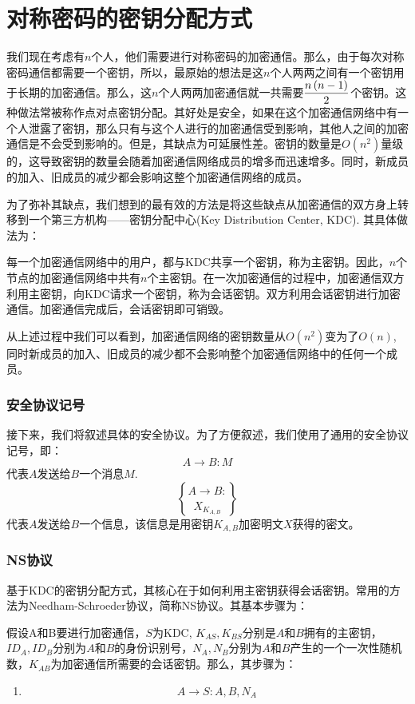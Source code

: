 \section{对称密码的密钥分配方式}
我们现在考虑有$n$个人，他们需要进行对称密码的加密通信。那么，由于每次对称密码通信都需要一个密钥，所以，最原始的想法是这$n$个人两两之间有一个密钥用于长期的加密通信。那么，这$n$个人两两加密通信就一共需要$\displaystyle\frac{n\left( {n-1}\right)}{2}$个密钥。这种做法常被称作点对点密钥分配。其好处是安全，如果在这个加密通信网络中有一个人泄露了密钥，那么只有与这个人进行的加密通信受到影响，其他人之间的加密通信是不会受到影响的。但是，其缺点为可延展性差。密钥的数量是$O(n^2)$量级的，这导致密钥的数量会随着加密通信网络成员的增多而迅速增多。同时，新成员的加入、旧成员的减少都会影响这整个加密通信网络的成员。\par
为了弥补其缺点，我们想到的最有效的方法是将这些缺点从加密通信的双方身上转移到一个第三方机构——密钥分配中心(Key Distribution Center, KDC). 其具体做法为：\par
每一个加密通信网络中的用户，都与KDC共享一个密钥，称为主密钥。因此，$n$个节点的加密通信网络中共有$n$个主密钥。在一次加密通信的过程中，加密通信双方利用主密钥，向KDC请求一个密钥，称为会话密钥。双方利用会话密钥进行加密通信。加密通信完成后，会话密钥即可销毁。\par
从上述过程中我们可以看到，加密通信网络的密钥数量从$O(n^2)$变为了$O(n)$, 同时新成员的加入、旧成员的减少都不会影响整个加密通信网络中的任何一个成员。
\subsubsection{安全协议记号}
接下来，我们将叙述具体的安全协议。为了方便叙述，我们使用了通用的安全协议记号，即：
\[A\to B: M\]
代表$A$发送给$B$一个消息$M$.
\[A\to B: \brace{X}_{K_{A, B}}\]
代表$A$发送给$B$一个信息，该信息是用密钥$K_{A, B}$加密明文$X$获得的密文。
\subsubsection{NS协议}
基于KDC的密钥分配方式，其核心在于如何利用主密钥获得会话密钥。常用的方法为Needham-Schroeder协议，简称NS协议。其基本步骤为：\par
假设A和B要进行加密通信，$S$为KDC, $K_{AS}, K_{BS}$分别是$A$和$B$拥有的主密钥，$ID_A, ID_B$分别为$A$和$B$的身份识别号，$N_A, N_B$分别为$A$和$B$产生的一个一次性随机数，$K_{AB}$为加密通信所需要的会话密钥。那么，其步骤为：
\begin{enumerate}
	\item \[A\to S: A, B, N_A\]
\end{enumerate}